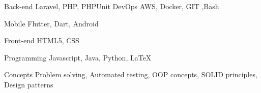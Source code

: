 

\begin{cvskills}

  \cvskill
    {Back-end} %
    {Laravel, PHP, PHPUnit} %
  \cvskill
    {DevOps} %
    {AWS, Docker, GIT ,Bash} %

  \cvskill
    {Mobile} %
    {Flutter, Dart, Android} %

  \cvskill
    {Front-end} %
    {HTML5, CSS} %

  \cvskill
    {Programming} %
    {Javascript, Java, Python, LaTeX} %

  \cvskill
    {Concepts} %
    {Problem solving, Automated testing, OOP concepts, SOLID principles, Design patterns} %

\end{cvskills}
